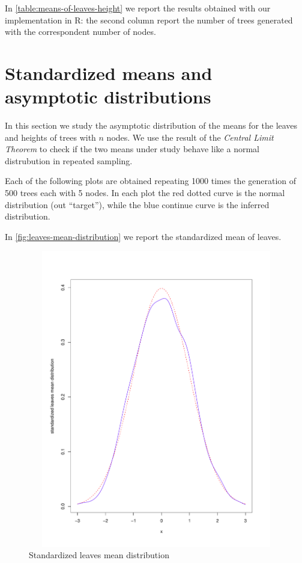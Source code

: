 In \autoref{table:means-of-leaves-height} we report the results
obtained with our implementation in R: the second column report the
number of trees generated with the correspondent number of nodes.

\section{Standardized means and asymptotic distributions}

In this section we study the asymptotic distribution of the means for
the leaves and heights of trees with $n$ nodes. We use the result of
the \emph{Central Limit Theorem} to check if the two means under study
behave like a normal distrubution in repeated sampling.

Each of the following plots are obtained repeating 1000 times the
generation of 500 trees each with 5 nodes. In each plot the red dotted
curve is the normal distribution (out ``target''), while the blue
continue curve is the inferred distribution.

In \autoref{fig:leaves-mean-distribution} we report the standardized
mean of leaves.
\begin{figure}[htb]
  \centering
  \includegraphics[height=13cm,
  width=13cm]{pictures/repeated-sampling-leaves-mean.pdf}
  \caption{Standardized leaves mean distribution}
  \label{fig:leaves-mean-distribution}
\end{figure}

